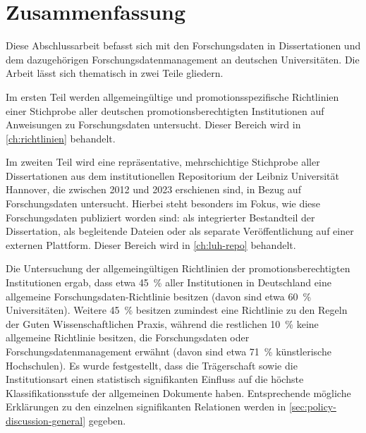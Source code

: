\chapter{Zusammenfassung}

Diese Abschlussarbeit befasst sich mit den Forschungsdaten in Dissertationen und dem dazugehörigen Forschungsdatenmanagement an deutschen Universitäten.
Die Arbeit lässt sich thematisch in zwei Teile gliedern.

Im ersten Teil werden allgemeingültige und promotionsspezifische Richtlinien einer Stichprobe aller deutschen promotionsberechtigten Institutionen auf Anweisungen zu Forschungsdaten untersucht.
Dieser Bereich wird in \cref{ch:richtlinien} behandelt.

Im zweiten Teil wird eine repräsentative, mehrschichtige Stichprobe aller Dissertationen aus dem institutionellen Repositorium der Leibniz Universität Hannover, die zwischen 2012 und 2023 erschienen sind, in Bezug auf Forschungsdaten untersucht.
Hierbei steht besonders im Fokus, wie diese Forschungsdaten publiziert worden sind: als integrierter Bestandteil der Dissertation, als begleitende Dateien oder als separate Veröffentlichung auf einer externen Plattform.
Dieser Bereich wird in \cref{ch:luh-repo} behandelt.

Die Untersuchung der allgemeingültigen Richtlinien der promotionsberechtigten Institutionen ergab, dass etwa \SI{45}{\percent} aller Institutionen in Deutschland eine allgemeine Forschungsdaten-Richtlinie besitzen (davon sind etwa \SI{60}{\percent} Universitäten).
Weitere \SI{45}{\percent} besitzen zumindest eine Richtlinie zu den Regeln der Guten Wissenschaftlichen Praxis, während die restlichen \SI{10}{\percent} keine allgemeine Richtlinie besitzen, die Forschungsdaten oder Forschungsdatenmanagement erwähnt (davon sind etwa \SI{71}{\percent} künstlerische Hochschulen).
Es wurde festgestellt, dass die Trägerschaft sowie die Institutionsart einen statistisch signifikanten Einfluss auf die höchste Klassifikationsstufe der allgemeinen Dokumente haben.
Entsprechende mögliche Erklärungen zu den einzelnen signifikanten Relationen werden in \cref{sec:policy-discussion-general} gegeben.

